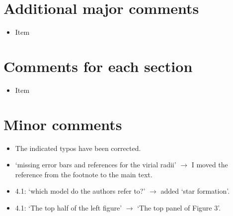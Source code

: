 \documentclass{article}
\begin{document}
\section*{Additional major comments}
\begin{itemize}
\item Item
\end{itemize}


\section*{Comments for each section}
\begin{itemize}
\item Item
\end{itemize}



\section*{Minor comments}
\begin{itemize}
\item The indicated typos have been corrected.
\item `missing error bars and references for the virial radii' $\rightarrow$
    I moved the reference from the footnote to the main text.
\item 4.1: `which model do the authors refer to?' $\rightarrow$ 
    added `star formation'.
\item 4.1: `The top half of the left figure' $\rightarrow$ 
    `The top panel of Figure 3'.
\end{itemize}
\end{document}

